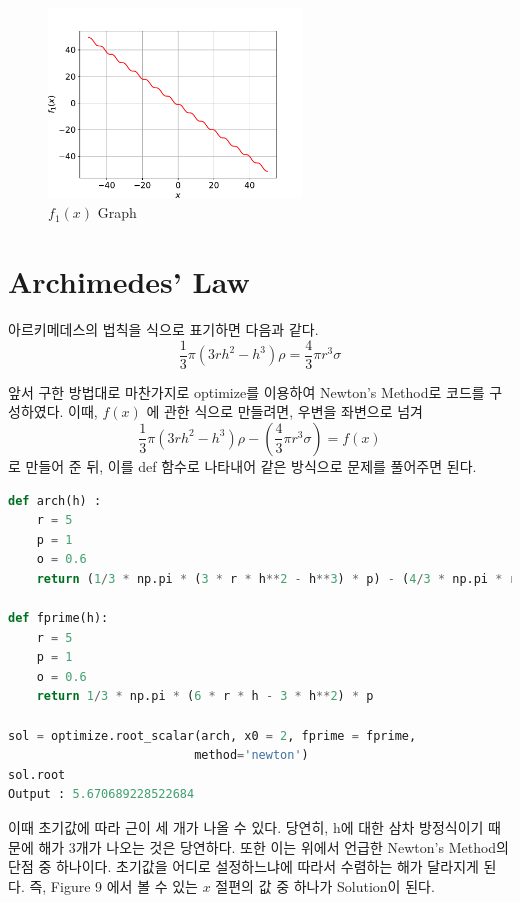 \documentclass[11pt]{article}
\begin{document}
\begin{figure}[!ht]
  \centering
  \includegraphics[width=0.6\textwidth]{Bisection_method1.pdf}
  \caption{$f_1(x)$ Graph}
\end{figure}
\clearpage















\section{Archimedes’ Law}
아르키메데스의 법칙을 식으로 표기하면 다음과 같다.
$$
\frac{1}{3}\pi (3rh^2 - h^3) \rho = \frac{4}{3}\pi r^3\sigma
$$

\noindent  
앞서 구한 방법대로 마찬가지로  optimize를 이용하여 Newton's Method로 코드를 구성하였다. 이때, $f(x)$ 에 관한 식으로 만들려면,  우변을 좌변으로 넘겨
$$
\frac{1}{3}\pi (3rh^2 - h^3) \rho - ( \frac{4}{3}\pi r^3\sigma ) = f(x) 
$$
로 만들어 준 뒤, 이를 def 함수로 나타내어 같은 방식으로 문제를 풀어주면 된다. 
\begin{lstlisting}[language=Python]
def arch(h) :
    r = 5
    p = 1
    o = 0.6
    return (1/3 * np.pi * (3 * r * h**2 - h**3) * p) - (4/3 * np.pi * r**3 * o)

def fprime(h):
    r = 5
    p = 1
    o = 0.6
    return 1/3 * np.pi * (6 * r * h - 3 * h**2) * p

sol = optimize.root_scalar(arch, x0 = 2, fprime = fprime, 
                          method='newton')
sol.root
Output : 5.670689228522684
\end{lstlisting}

이때 초기값에 따라 근이 세 개가 나올 수 있다. 당연히, h에 대한 삼차 방정식이기 때문에 해가 3개가 나오는 것은 당연하다. 또한 이는 위에서 언급한 Newton's Method의 단점 중 하나이다. 초기값을 어디로 설정하느냐에 따라서 수렴하는 해가 달라지게 된다. 즉, Figure 9 에서 볼 수 있는 $x$ 절편의 값 중 하나가 Solution이 된다.
\end{document}

